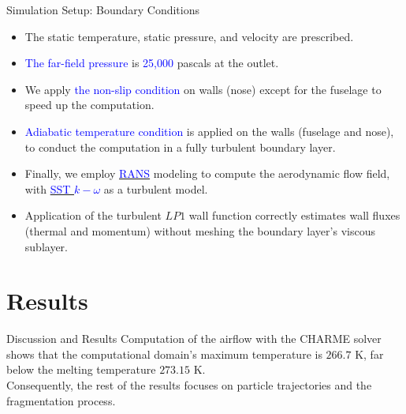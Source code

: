 \documentclass[aspectratio=169,xcolor=dvipsnames]{beamer}
\begin{document}
\begin{frame}{Simulation Setup: Boundary Conditions}
   \begin{itemize}
       \item The static temperature, static pressure, and velocity are prescribed. 
       \item \textcolor{blue}{The far-field pressure} is \textcolor{blue}{25,000} pascals at the outlet. 
       \item We apply \textcolor{blue}{the non-slip condition} on walls (nose) except for the fuselage to speed up the computation. 
       \item \textcolor{blue}{Adiabatic temperature condition} is applied on the walls (fuselage and nose), to conduct the computation in a fully turbulent boundary layer. 
       \item Finally, we employ  \href{https://resources.system-analysis.cadence.com/blog/msa2021-the-reynolds-averaged-navier-stokes-rans-equations-and-models}{\textcolor{blue}{RANS}} modeling to compute the aerodynamic flow field, with \href{https://turbmodels.larc.nasa.gov/sst.html}{\textcolor{blue}{SST $k-\omega$}} as a turbulent model. 
       \item Application of the turbulent $LP1$ wall function correctly estimates wall fluxes (thermal and momentum) without meshing the boundary layer's viscous sublayer. 
   \end{itemize}
\end{frame}

\section{Results}


\begin{frame}{Discussion and Results}
  Computation of the airflow with the CHARME solver shows that the computational domain's maximum temperature is $266.7$ K, far below the melting temperature $273.15$ K.\\ 
  \vspace{2pt}
  Consequently, the rest of the results focuses on particle trajectories and the fragmentation process. 
\end{frame}
\end{document}
